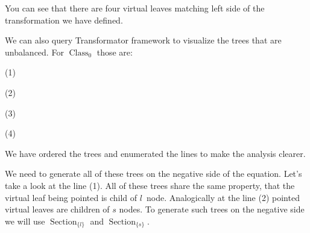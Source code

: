 \documentclass[final]{article}
\theoremstyle{definition}
\theoremstyle{definition}
\theoremstyle{remark}
\DeclareMathOperator{\tClass}{\text{Class}}
\DeclareMathOperator{\tSection}{\text{Section}}
\newcommand{\includeinlinescaledsvg}[3]{\begin{minipage}{#1\textwidth}\begin{center}\end{center}\end{minipage}}
\begin{document}
You can see that there are four virtual leaves matching left side of the transformation we have defined.

We can also query Transformator framework to visualize the trees that are unbalanced. For \(\tClass_0\) those are:

(1)%
\begin{minipage}{.98\textwidth}\begin{center}%
\includeinlinescaledsvg{.33}{.4}{lambda__trees_00__2}%
\includeinlinescaledsvg{.33}{.4}{lambda__trees_00__3}%
\includeinlinescaledsvg{.33}{.4}{lambda__trees_00__7}%
\end{center}\end{minipage}

(2)%
\begin{minipage}{.98\textwidth}\begin{center}%
\includeinlinescaledsvg{.33}{.4}{lambda__trees_00__4}%
\includeinlinescaledsvg{.33}{.4}{lambda__trees_00__12}%
\includeinlinescaledsvg{.33}{.4}{lambda__trees_00__13}%
\end{center}\end{minipage}

(3)%
\begin{minipage}{.98\textwidth}\begin{center}%
\includeinlinescaledsvg{.16}{.4}{lambda__trees_00__0}%
\includeinlinescaledsvg{.16}{.4}{lambda__trees_00__1}%
\includeinlinescaledsvg{.16}{.4}{lambda__trees_00__5}%
\includeinlinescaledsvg{.16}{.4}{lambda__trees_00__6}%
\includeinlinescaledsvg{.16}{.4}{lambda__trees_00__14}%
\includeinlinescaledsvg{.16}{.4}{lambda__trees_00__15}%
\end{center}\end{minipage}

(4)%
\begin{minipage}{.98\textwidth}\begin{center}%
\includeinlinescaledsvg{.25}{.4}{lambda__trees_00__8}%
\includeinlinescaledsvg{.25}{.4}{lambda__trees_00__9}%
\includeinlinescaledsvg{.25}{.4}{lambda__trees_00__10}%
\includeinlinescaledsvg{.25}{.4}{lambda__trees_00__11}%
\end{center}\end{minipage}

We have ordered the trees and enumerated the lines to make the analysis clearer.

We need to generate all of these trees on the negative side of the equation. Let's take a look at the line (1). All of these trees share the same property, that the virtual leaf being pointed is child of \(l\)~node. Analogically at the line (2) pointed virtual leaves are children of \(s\) nodes. To generate such trees on the negative side we will use \(\tSection_{\{l\}}\) and \(\tSection_{\{s\}}\).
\end{document}
